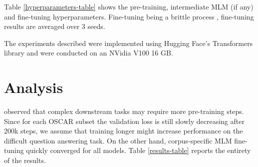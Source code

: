 \documentclass[11pt,a4paper]{article}
\begin{document}
Table \ref{hyperparameters-table} shows the pre-training, intermediate MLM (if any) and fine-tuning hyperparameters. 
Fine-tuning being a brittle process \citep{seedfinetuning}, fine-tuning results are averaged over 3 seeds. 

The experiments described were implemented using Hugging Face's Transformers library \citep{huggingface} and were conducted on an NVidia V100 16 GB.

\section{Analysis}

\citet{camembert} observed that complex downstream tasks may require more pre-training steps. Since for each OSCAR subset the validation loss is still slowly decreasing after 200k steps, we assume that training longer might increase performance on the difficult question answering task. On the other hand, corpus-specific MLM fine-tuning quickly converged for all models. Table \ref{results-table} reports the entirety of the results.
\end{document}
